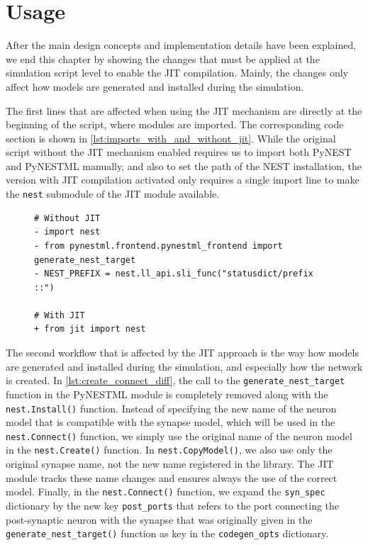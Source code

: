 \section{Usage}


After the main design concepts and implementation details have been explained, we end this chapter by showing the changes that must be applied at the simulation script level to enable the JIT compilation. Mainly, the changes only affect how models are generated and installed during the simulation.

The first lines that are affected when using the JIT mechanism are directly at the beginning of the script, where modules are imported. The corresponding code section is shown in \autoref{lst:imports_with_and_without_jit}. While the original script without the JIT mechanism enabled requires us to import both PyNEST and PyNESTML manually, and also to set the path of the NEST installation, the version with JIT compilation activated only requires a single import line to make the \texttt{nest} submodule of the JIT module available.

\begin{figure}[ht!]
\centering
\begin{lstlisting}[language=Pydiff, label=lst:imports_with_and_without_jit, caption={The simulation script imports with and without the JIT mechanism enabled. Lines that are necessary without the JIT module are shown in red, lines in the new version are shown in green.}]
# Without JIT
- import nest
- from pynestml.frontend.pynestml_frontend import generate_nest_target
- NEST_PREFIX = nest.ll_api.sli_func("statusdict/prefix ::")

# With JIT
+ from jit import nest

\end{lstlisting}
\end{figure}


The second workflow that is affected by the JIT approach is the way how models are generated and installed during the simulation, and especially how the network is created. In \autoref{lst:create_connect_diff}, the call to the \texttt{generate\_nest\_target} function in the PyNESTML module is completely removed along with the \texttt{nest.Install()} function. Instead of specifying the new name of the neuron model that is compatible with the synapse model, which will be used in the \texttt{nest.Connect()} function, we simply use the original name of the neuron model in the \texttt{nest.Create()} function. In \texttt{nest.CopyModel()}, we also use only the original synapse name, not the new name registered in the library. The JIT module tracks these name changes and ensures always the use of the correct model. Finally, in the \texttt{nest.Connect()} function, we expand the \texttt{syn\_spec} dictionary by the new key \texttt{post\_ports} that refers to the port connecting the post-synaptic neuron with the synapse that was originally given in the \texttt{generate\_nest\_target()} function as key in the \texttt{codegen\_opts} dictionary.


